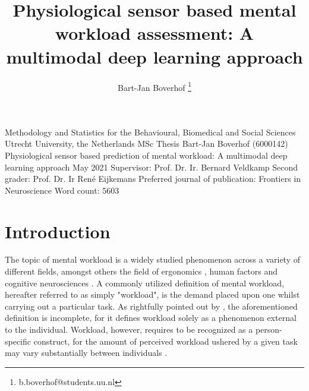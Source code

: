 \documentclass[fleqn,11pt]{paper}
\title{Physiological sensor based mental workload assessment: A multimodal deep learning approach}
\author[1]{Bart-Jan Boverhof \thanks{b.boverhof@students.uu.nl}}
\affil[1]{\normalsize Faculty of Social and Behavioural Sciences, Utrecht University}
\begin{document}
\begin{titlepage}
\vspace{10mm}

\begin{Large}
{\setlength{\parindent}{0cm}
Methodology and Statistics for the Behavioural, Biomedical and Social Sciences
}
\vspace{2mm}
\newline Utrecht University, the Netherlands
\vspace{18mm}
\newline MSc Thesis Bart-Jan Boverhof (6000142)
\vspace{2mm}
\newline Physiological sensor based prediction of mental workload: A multimodal deep learning approach
\vspace{2mm}
\newline May 2021
\vspace{18mm}
\newline Supervisor:
\vspace{1mm}
\newline Prof. Dr. Ir. Bernard Veldkamp
\vspace{10mm}
\newline Second grader:
\vspace{1mm}
\newline Prof. Dr. Ir René Eijkemans
\vspace{10mm}
\newline Preferred journal of publication: Frontiers in Neuroscience
\vspace{1mm}
\newline Word count: 5603
\end{Large}
\end{titlepage}

\flushbottom
\maketitle
%
%
\thispagestyle{empty}

\section{Introduction}
The topic of mental workload is a widely studied phenomenon across a variety of different fields, amongst others the field of ergonomics \cite{young2015state}, human factors \cite{pretorius2007development} and cognitive neurosciences \cite{shuggi2017mental}. A commonly utilized definition of mental workload, hereafter referred to as simply "workload", is the demand placed upon one whilst carrying out a particular task. As rightfully pointed out by , the aforementioned definition is incomplete, for it defines workload solely as a phenomenon external to the individual. Workload, however, requires to be recognized as a person-specific construct, for the amount of perceived workload ushered by a given task may vary substantially between individuals \cite{de1996measurement}. 
\end{document}
